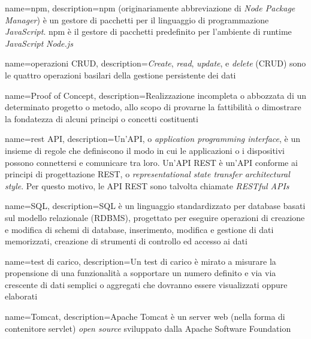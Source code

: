 {
    name=npm,
    description={npm (originariamente abbreviazione di \textit{Node Package Manager}) è un gestore di pacchetti per il linguaggio di programmazione \textit{JavaScript}. npm è il gestore di pacchetti predefinito per l'ambiente di runtime \textit{JavaScript} \textit{Node.js} \cite{site:wiki}}
}

{
    name=operazioni CRUD,
    description={\textit{Create}, \textit{read}, \textit{update}, e \textit{delete} (CRUD) sono le quattro operazioni basilari della gestione persistente dei dati \cite{site:wiki}}
}

{
    name=Proof of Concept,
    description={Realizzazione incompleta o abbozzata di un determinato progetto o metodo, allo scopo di provarne la fattibilità o dimostrare la fondatezza di alcuni principi o concetti costituenti \cite{site:wiki}}
}


{
    name=rest API,
    description={Un'API, o \textit{application programming interface}, è un insieme di regole che definiscono il modo in cui le applicazioni o i dispositivi possono connettersi e comunicare tra loro. Un'API REST è un'API conforme ai principi di progettazione REST, o \textit{representational state transfer architectural style}. Per questo motivo, le API REST sono talvolta chiamate \textit{RESTful APIs} \cite{site:ibm}}
}

{
    name=SQL,
    description={SQL è un linguaggio standardizzato per database basati sul modello relazionale (RDBMS), progettato per eseguire operazioni di creazione e modifica di schemi di database, inserimento, modifica e gestione di dati memorizzati, creazione di strumenti di controllo ed accesso ai dati \cite{site:wiki}}
}

{
    name=test di carico,
    description={Un test di carico è mirato a misurare la propensione di una funzionalità a sopportare un numero definito e via via crescente di dati semplici o aggregati che dovranno essere visualizzati oppure elaborati \cite{site:wiki}}
}

{
    name=Tomcat,
    description={Apache Tomcat è un server web (nella forma di contenitore servlet) \textit{open source} sviluppato dalla Apache Software Foundation \cite{site:wiki}}
}

